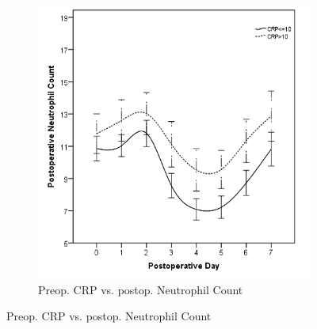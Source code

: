 \begin{figure}[p]
	\vspace{1cm}
	
	\begin{subfigure}{0.48\textwidth}
		\centering
		\includegraphics[width=\textwidth]{Figures/sirs_crp_neut}
		\caption{Preop. 
CRP vs. 
postop. 
Neutrophil Count}
		\label{fig:sirs_crp_neut}
	\end{subfigure}	
\end{figure}


